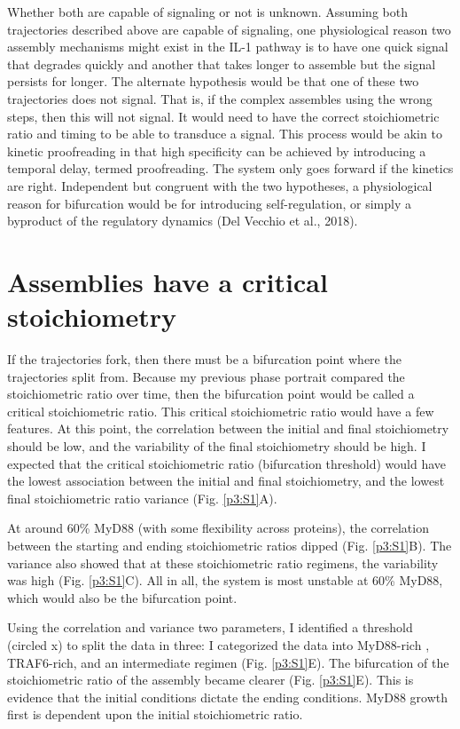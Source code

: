 Whether both are capable of signaling or not is unknown. Assuming both trajectories described above are capable of signaling, one physiological reason two assembly mechanisms might exist in the IL-1 pathway is to have one quick signal that degrades quickly and another that takes longer to assemble but the signal persists for longer. The alternate hypothesis would be that one of these two trajectories does not signal. That is, if the complex assembles using the wrong steps, then this will not signal. It would need to have the correct stoichiometric ratio and timing to be able to transduce a signal. This process would be akin to kinetic proofreading in that high specificity can be achieved by introducing a temporal delay, termed proofreading. The system only goes forward if the kinetics are right. Independent but congruent with the two hypotheses, a physiological reason for bifurcation would be for introducing self-regulation, or simply a byproduct of the regulatory dynamics (Del Vecchio et al., 2018).

\section{Assemblies have a critical stoichiometry}
If the trajectories fork, then there must be a bifurcation point where the trajectories split from. Because my previous phase portrait compared the stoichiometric ratio over time, then the bifurcation point would be called a critical stoichiometric ratio. This critical stoichiometric ratio would have a few features. At this point, the correlation between the initial and final stoichiometry should be low, and the variability of the final stoichiometry should be high. I expected that the critical stoichiometric ratio (bifurcation threshold) would have the lowest association between the initial and final stoichiometry, and the lowest final stoichiometric ratio variance (Fig. \ref{p3:S1}A).

At around 60\% MyD88 (with some flexibility across proteins), the correlation between the starting and ending stoichiometric ratios dipped (Fig. \ref{p3:S1}B). The variance also showed that at these stoichiometric ratio regimens, the variability was high (Fig. \ref{p3:S1}C). All in all, the system is most unstable at 60\% MyD88, which would also be the bifurcation point.

Using the correlation and variance two parameters, I identified a threshold (circled x) to split the data in three: I categorized the data into MyD88-rich , TRAF6-rich, and an intermediate regimen (Fig. \ref{p3:S1}E). The bifurcation of the stoichiometric ratio of the assembly became clearer (Fig. \ref{p3:S1}E). This is evidence that the initial conditions dictate the ending conditions. MyD88 growth first is dependent upon the initial stoichiometric ratio.

